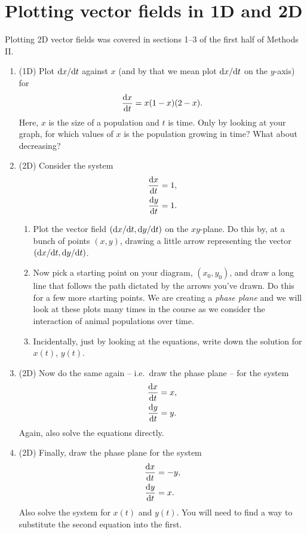 \documentclass[a4paper,12pt]{article}
\begin{document}
\section{Plotting vector fields in 1D and 2D}
Plotting 2D vector fields was covered in sections 1--3 of the first half of Methods II. 
\begin{enumerate}[label=(\alph*)]
    \item (1D) Plot $\fd{x}{t}$ against $x$ (and by that we mean plot $\fd{x}{t}$ on the $y$-axis) for
    \begin{equation*}
        \fd{x}{t} = x(1-x)(2-x).
    \end{equation*}    
    Here, $x$ is the size of a population and $t$ is time. Only by looking at your graph, for which values of $x$ is the population growing in time? What about decreasing?
    \item (2D) Consider the system
    \begin{align*}
        \fd{x}{t} &= 1,\\
        \fd{y}{t} &= 1.
    \end{align*}
    \begin{enumerate}[label=(\roman*)]
        \item Plot the vector field $(\fd{x}{t},\fd{y}{t})$ on the $xy$-plane. Do this by, at a bunch of points $(x,y)$, drawing a little arrow representing the vector $(\fd{x}{t},\fd{y}{t})$.
    
        \item Now pick a starting point on your diagram, $(x_0,y_0)$, and draw a long line that follows the path dictated by the arrows you've drawn. Do this for a few more starting points. We are creating a \emph{phase plane} and we will look at these plots many times in the course as we consider the interaction of animal populations over time.
        
        \item Incidentally, just by looking at the equations, write down the solution for $x(t)$, $y(t)$.
    \end{enumerate}
    
    \item (2D) Now do the same again -- i.e.\ draw the phase plane -- for the system
    \begin{align*}
        \fd{x}{t} &= x,\\
        \fd{y}{t} &= y.
    \end{align*}    
    Again, also solve the equations directly.
    
    \item (2D) Finally, draw the phase plane for the system
    \begin{align*}
        \fd{x}{t} &= -y,\\
        \fd{y}{t} &= x.
    \end{align*}       
    Also solve the system for $x(t)$ and $y(t)$. You will need to find a way to substitute the second equation into the first.
\end{enumerate}
\end{document}
